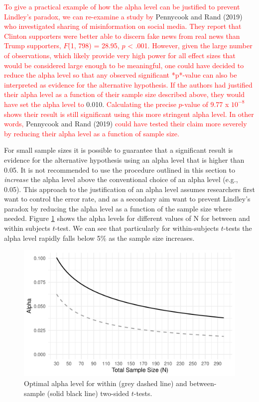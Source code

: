 \documentclass[
  english,
  ,man, a4paper,floatsintext]{apa6}
\begin{document}
\textcolor{red}{To give a practical example of how the alpha level can be justified to prevent Lindley's paradox, we can re-examine a study by} Pennycook and Rand (2019)
\textcolor{red}{who investigated sharing of misinformation on social media. They report that Clinton supporters were better able to discern fake news from real news than Trump supporters, $F$(1, 798) = 28.95, $p$ < .001. However, given the large number of observations, which likely provide very high power for all effect sizes that would be considered large enough to be meaningful, one could have decided to reduce the alpha level so that any observed significant *p*-value can also be interpreted as evidence for the alternative hypothesis. If the authors had justified their alpha level as a function of their sample size described above, they would have set the alpha level to} 0.010.
\textcolor{red}{Calculating the precise $p$-value of 9.77 x $10^{-8}$ shows their result is still significant using this more stringent alpha level. In other words,} Pennycook and Rand (2019) \textcolor{red}{could have tested their claim more severely by reducing their alpha level as a function of sample size.}

For small sample sizes it is possible to guarantee that a significant result is evidence for the alternative hypothesis using an alpha level that is higher than 0.05. It is not recommended to use the procedure outlined in this section to \emph{increase} the alpha level above the conventional choice of an alpha level (e.g., 0.05). This approach to the justification of an alpha level assumes researchers first want to control the error rate, and as a secondary aim want to prevent Lindley's paradox by reducing the alpha level as a function of the sample size where needed. Figure \ref{fig:lindleyplot} shows the alpha levels for different values of N for between and within subjects \(t\)-test. We can see that particularly for within-subjects \(t\)-tests the alpha level rapidly falls below 5\% as the sample size increases.

\begin{figure}
\centering
\includegraphics{Justify_in_Practice_files/figure-latex/lindleyplot-1.pdf}
\caption{\label{fig:lindleyplot}Optimal alpha level for within (grey dashed line) and between-sample (solid black line) two-sided \(t\)-tests.}
\end{figure}
\end{document}
